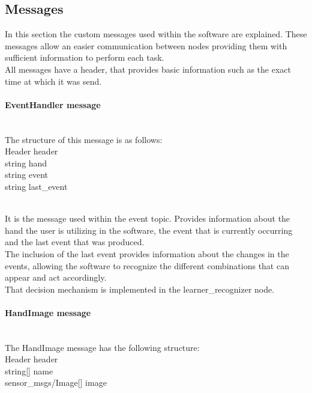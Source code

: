 \subsection{Messages}
\label{messages}

	In this section the custom messages used within the software are explained. These messages allow an easier communication between nodes providing them with sufficient information to perform each task. 
	\\

	All messages have a header, that provides basic information such as the exact time at which it was send. 


	\paragraph{EventHandler message}\mbox{} \\
		The structure of this message is as follows: \\

		Header header\\
		string hand\\
		string event\\
		string last\_event

		\\

		It is the message used within the event topic. Provides information about the hand the user is utilizing in the software, the event that is currently occurring and the last event that was produced. 
		\\

		The inclusion of the last event provides information about the changes in the events, allowing the software to recognize the different combinations that can appear and act accordingly. 
		\\

		That decision mechanism is implemented in the learner\_recognizer node. 

	\paragraph{HandImage message}\mbox{} \\

		The HandImage message has the following structure: \\
		Header header\\
		string[] name\\
		sensor\_msgs/Image[] image

